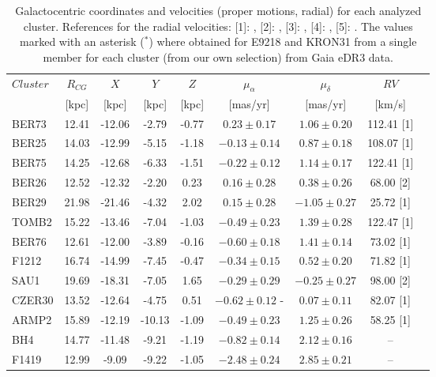 \documentclass{aa}
\begin{document}
\begin{appendix}
  \begin{table}
   \caption{Galactocentric coordinates and velocities (proper motions, radial)
   for each analyzed cluster. References for the radial velocities: [1]: 
   \cite{Tarricq_2021}, [2]: \cite{Dias_2002}, [3]: \cite{Soubiran_2018}, [4]: 
   \cite{Dias_2007}, [5]: \cite{Frinchaboy_2006}. The values marked with an
   asterisk ($^*$) where obtained for E9218 and KRON31 from a single member for
   each cluster (from our own selection) from Gaia eDR3 data.}
   \label{tab:velocities}
   \centering
   \renewcommand{\arraystretch}{1.3}
   \begin{tabular}{lcccccccc}
    \hline \hline
    $Cluster$ & $R_{CG}$ & $X$ & $Y$ & $Z$ & $\mu_{\alpha}$ & $\mu_{\delta}$ & $RV$\\
     & [kpc] & [kpc] & [kpc] & [kpc] & [mas/yr] & [mas/yr] & [km/s]\\
    \hline
    BER73 & 12.41 & -12.06  & -2.79 & -0.77 & $0.23 \pm 0.17$ & $1.06 \pm 0.20$ & 112.41  [1]\\
    BER25 & 14.03 & -12.99  & -5.15 & -1.18 & $-0.13  \pm 0.14$ & $0.87 \pm 0.18$ & 108.07  [1]\\
    BER75 & 14.25 & -12.68  & -6.33 & -1.51 & $-0.22  \pm 0.12$ & $1.14 \pm 0.17$ & 122.41  [1]\\
    BER26 & 12.52 & -12.32  & -2.20 & 0.23  & $0.16 \pm 0.28$ & $0.38 \pm 0.26$ & 68.00 [2]\\
    BER29 & 21.98 & -21.46  & -4.32 & 2.02  & $0.15 \pm 0.28$ & $-1.05  \pm 0.27$ & 25.72 [1]\\
    TOMB2 & 15.22 & -13.46  & -7.04 & -1.03 & $-0.49  \pm 0.23$ & $1.39 \pm 0.28$ & 122.47  [1]\\
    BER76 & 12.61 & -12.00  & -3.89 & -0.16 & $-0.60  \pm 0.18$ & $1.41 \pm 0.14$ & 73.02 [1]\\
    F1212 & 16.74 & -14.99  & -7.45 & -0.47 & $-0.34  \pm 0.15$ & $0.52 \pm 0.20$ & 71.82 [1]\\
    SAU1  & 19.69 & -18.31  & -7.05 & 1.65  & $-0.29  \pm 0.29$ & $-0.25  \pm 0.27$ & 98.00 [2]\\
    CZER30  & 13.52 & -12.64  & -4.75 & 0.51  & $-0.62  \pm 0.12$ -&  $0.07 \pm 0.11$ & 82.07 [1]\\
    ARMP2 & 15.89 & -12.19  & -10.13  & -1.09 & $-0.49  \pm 0.23$ & $1.25 \pm 0.26$ & 58.25 [1]\\
    BH4 & 14.77 & -11.48  & -9.21 & -1.19 & $-0.82  \pm 0.14$ & $2.12\pm0.16$ & --  \\
    F1419 & 12.99 & -9.09 & -9.22 & -1.05 & $-2.48  \pm 0.24$ & $2.85 \pm 0.21$ & --\\  

\end{tabular}
\end{table}
\end{appendix}
\end{document}
